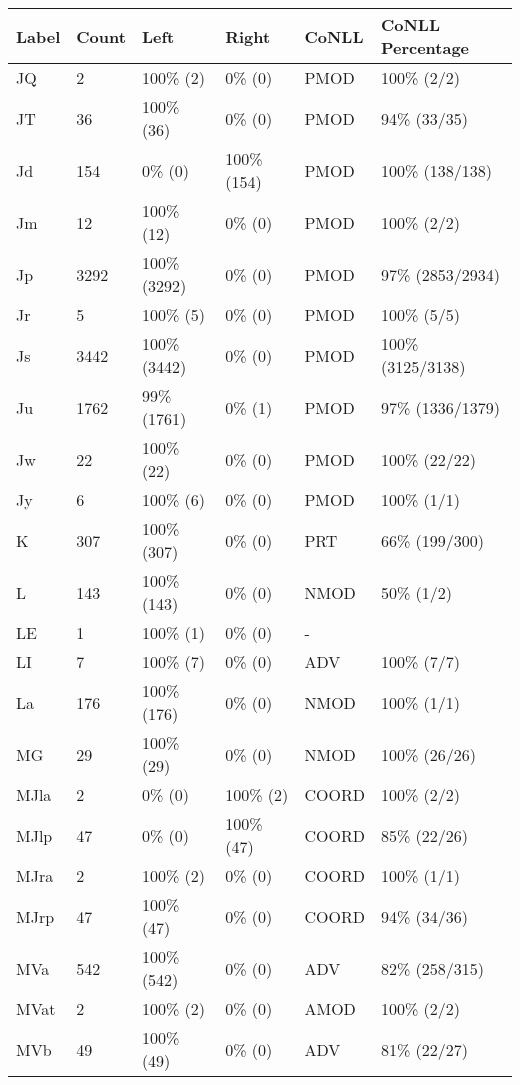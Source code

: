 \begin{figure*}
\begin{tabular}{|l|l|l|l||l|l|}
\hline
Label & Count & Left & Right & CoNLL & CoNLL Percentage\\ 
\hline
 JQ & 2 & 100\% (2) & 0\% (0) & PMOD & 100\% (2/2) \\ 
\hline
 JT & 36 & 100\% (36) & 0\% (0) & PMOD & 94\% (33/35) \\ 
\hline
 Jd & 154 & 0\% (0) & 100\% (154) & PMOD & 100\% (138/138) \\ 
\hline
 Jm & 12 & 100\% (12) & 0\% (0) & PMOD & 100\% (2/2) \\ 
\hline
 Jp & 3292 & 100\% (3292) & 0\% (0) & PMOD & 97\% (2853/2934) \\ 
\hline
 Jr & 5 & 100\% (5) & 0\% (0) & PMOD & 100\% (5/5) \\ 
\hline
 Js & 3442 & 100\% (3442) & 0\% (0) & PMOD & 100\% (3125/3138) \\ 
\hline
 Ju & 1762 & 99\% (1761) & 0\% (1) & PMOD & 97\% (1336/1379) \\ 
\hline
 Jw & 22 & 100\% (22) & 0\% (0) & PMOD & 100\% (22/22) \\ 
\hline
 Jy & 6 & 100\% (6) & 0\% (0) & PMOD & 100\% (1/1) \\ 
\hline
 K & 307 & 100\% (307) & 0\% (0) & PRT & 66\% (199/300) \\ 
\hline
 L & 143 & 100\% (143) & 0\% (0) & NMOD & 50\% (1/2) \\ 
\hline
 LE & 1 & 100\% (1) & 0\% (0) & - &  \\ 
\hline
 LI & 7 & 100\% (7) & 0\% (0) & ADV & 100\% (7/7) \\ 
\hline
 La & 176 & 100\% (176) & 0\% (0) & NMOD & 100\% (1/1) \\ 
\hline
 MG & 29 & 100\% (29) & 0\% (0) & NMOD & 100\% (26/26) \\ 
\hline
 MJla & 2 & 0\% (0) & 100\% (2) & COORD & 100\% (2/2) \\ 
\hline
 MJlp & 47 & 0\% (0) & 100\% (47) & COORD & 85\% (22/26) \\ 
\hline
 MJra & 2 & 100\% (2) & 0\% (0) & COORD & 100\% (1/1) \\ 
\hline
 MJrp & 47 & 100\% (47) & 0\% (0) & COORD & 94\% (34/36) \\ 
\hline
 MVa & 542 & 100\% (542) & 0\% (0) & ADV & 82\% (258/315) \\ 
\hline
 MVat & 2 & 100\% (2) & 0\% (0) & AMOD & 100\% (2/2) \\ 
\hline
 MVb & 49 & 100\% (49) & 0\% (0) & ADV & 81\% (22/27) \\ 

\end{tabular}
\end{figure*}
